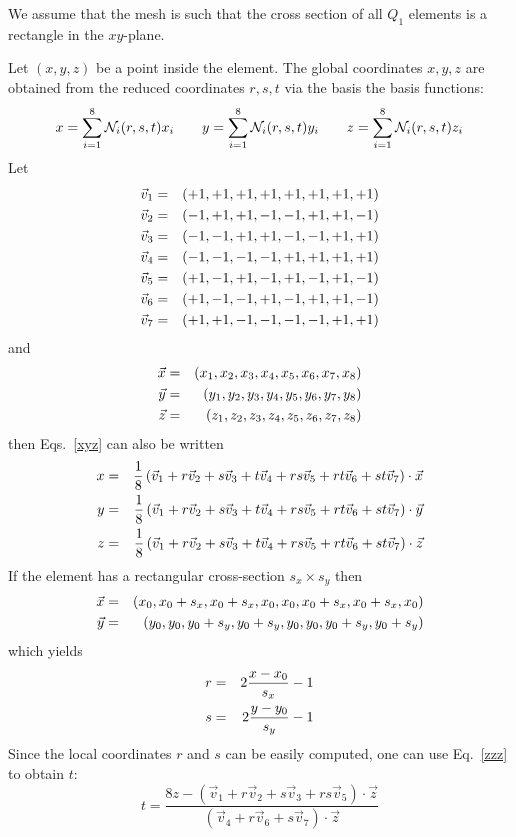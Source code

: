 We assume that the mesh is such that the cross section of all $Q_1$ elements 
is a rectangle in the $xy$-plane. 

Let $(x,y,z)$ be a point inside the element. 
The global coordinates $x,y,z$ are obtained from the 
reduced coordinates $r,s,t$ via the basis the basis functions:
\begin{eqnarray}
x=\sum_{i=1}^8 {\mathcal{N}}_i (r,s,t) x_i \qquad 
y=\sum_{i=1}^8 {\mathcal{N}}_i (r,s,t) y_i  \qquad 
z=\sum_{i=1}^8 {\mathcal{N}}_i (r,s,t) z_i \label{xyz}
\end{eqnarray}
Let 
\begin{eqnarray}
{\vec v}_1 &=& (+1,+1,+1,+1,+1,+1,+1,+1) \nonumber\\
{\vec v}_2 &=& (-1,+1,+1,-1,-1,+1,+1,-1) \nonumber\\
{\vec v}_3 &=& (-1,-1,+1,+1,-1,-1,+1,+1) \nonumber\\
{\vec v}_4 &=& (-1,-1,-1,-1,+1,+1,+1,+1) \nonumber\\
{\vec v}_5 &=& (+1,-1,+1,-1,+1,-1,+1,-1) \nonumber\\
{\vec v}_6 &=& (+1,-1,-1,+1,-1,+1,+1,-1) \nonumber\\
{\vec v}_7 &=& (+1,+1,-1,-1,-1,-1,+1,+1) \nonumber
\end{eqnarray}
and 
\begin{eqnarray}
{\vec x} &=& (x_1,x_2,x_3,x_4,x_5,x_6,x_7,x_8) \nonumber\\
{\vec y} &=& (y_1,y_2,y_3,y_4,y_5,y_6,y_7,y_8) \nonumber\\
{\vec z} &=& (z_1,z_2,z_3,z_4,z_5,z_6,z_7,z_8) \nonumber
\end{eqnarray}
then Eqs.~\eqref{xyz} can also be written
\begin{eqnarray}
x&=&\frac{1}{8} \left( {\vec v}_1 + r  {\vec v}_2 + s  {\vec v}_3 + t  {\vec v}_4 
                 + rs  {\vec v}_5 + rt {\vec v}_6 + st {\vec v}_7 \right) \cdot {\vec x} \nonumber\\ 
y&=&\frac{1}{8} \left( {\vec v}_1 + r  {\vec v}_2 + s  {\vec v}_3 + t  {\vec v}_4 
                 + rs  {\vec v}_5 + rt {\vec v}_6 + st {\vec v}_7 \right) \cdot {\vec y} \nonumber\\
z&=&\frac{1}{8} \left( {\vec v}_1 + r  {\vec v}_2 + s  {\vec v}_3 + t  {\vec v}_4 
                 + rs  {\vec v}_5 + rt {\vec v}_6 + st {\vec v}_7 \right) \cdot {\vec z} \label{zzz}
\end{eqnarray}
If the element has a rectangular cross-section $s_x \times s_y$ then 
\begin{eqnarray}
{\vec x} &=& (x_0,x_0+s_x,x_0+s_x,x_0,x_0,x_0+s_x,x_0+s_x,x_0) \nonumber\\
{\vec y} &=& (y_0,y_0,y_0+s_y,y_0+s_y,y_0,y_0,y_0+s_y,y_0+s_y) \nonumber
\end{eqnarray}
which yields
\begin{eqnarray}
r&=& 2\frac{x-x_0}{s_x}-1  \nonumber\\
s&=& 2\frac{y-y_0}{s_y}-1  \nonumber
\end{eqnarray}
Since the local coordinates $r$ and $s$ can be easily computed, one can use Eq.~\eqref{zzz} to obtain $t$:
\[
t=\frac{8z - ({\vec v}_1 + r {\vec v}_2 + s {\vec v}_3 + rs  {\vec v}_5 ) \cdot {\vec z}} 
{ ({\vec v}_4  + r  {\vec v}_6 + s  {\vec v}_7)  \cdot {\vec z} }
\]







